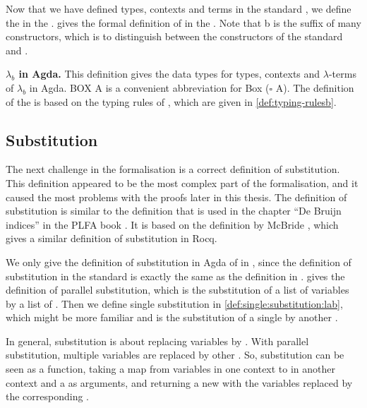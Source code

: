 Now that we have defined types, contexts and terms in the standard \lc, we define the \lterms in the \lab.
 gives the formal definition of \lterms in the \lab. Note that \textsf{b} is the suffix of many constructors,
which is to distinguish between the constructors of the standard \lc and \lab.  
\begin{definition}
  \label{def:terms:lab}
  \textbf{\boldmath${\lambda_b}$ in Agda.}
  This definition gives the data types for types, contexts and $\lambda$-terms of $\lambda_b$ in Agda.
  \textsf{BOX A} is a convenient abbreviation for \textsf{Box ($\square$ A)}.
  The definition of the \lterms is based on the typing rules of \lab, which are given in \cref{def:typing-rulesb}.
  
\end{definition} 



\subsection{Substitution}
The next challenge in the formalisation is a correct definition of substitution.
This definition appeared to be the most complex part of the formalisation, and it caused the most problems with the proofs later in this thesis.
The definition of substitution is similar to the definition that is used in the chapter ``De Bruijn indices'' in the PLFA book \cite{plfa22.08}.
It is based on the definition by McBride \cite{BENTON2012}, which gives a similar definition of substitution in Rocq.

We only give the definition of substitution in Agda of \lterms in \lab, since the definition of substitution in the standard \lc is exactly the same as the definition in \cite{plfa22.08}.
 gives the definition of parallel substitution, which is the substitution of a list of variables by a list of \lterms.
Then we define single substitution in \cref{def:single:substitution:lab}, which might be more familiar and is the substitution of a single \lterm by another \lterm.

In general, substitution is about replacing variables by \lterms. With parallel substitution, multiple variables are replaced by other \lterms. 
So, substitution can be seen as a function, taking a map from variables in one context to \lterms in another context
and a \lterm as arguments, and returning a new \lterm with the variables replaced by the corresponding \lterms.

